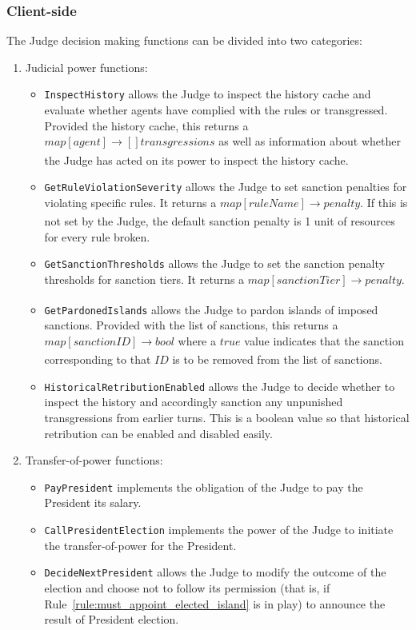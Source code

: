 \subsubsection{Client-side}
The Judge decision making functions can be divided into two categories:
\begin{enumerate}
    \item Judicial power functions:
    \begin{itemize}
        \item \texttt{InspectHistory} allows the Judge to inspect the history cache and evaluate whether agents have complied with the rules or transgressed. Provided the history cache, this returns a $map[agent] \xrightarrow[]{} []transgressions$ as well as information about whether the Judge has acted on its power to inspect the history cache.
        \item \texttt{GetRuleViolationSeverity} allows the Judge to set sanction penalties for violating specific rules. It returns a $map[ruleName] \xrightarrow[]{} penalty$. If this is not set by the Judge, the default sanction penalty is 1 unit of resources for every rule broken.
        \item \texttt{GetSanctionThresholds} allows the Judge to set the sanction penalty thresholds for sanction tiers. It returns a $map[sanctionTier] \xrightarrow[]{} penalty$.
        \item \texttt{GetPardonedIslands} allows the Judge to pardon islands of imposed sanctions. Provided with the list of sanctions, this returns a $map[sanctionID] \xrightarrow[]{} bool$ where a $true$ value indicates that the sanction corresponding to that $ID$ is to be removed from the list of sanctions.
        \item \texttt{HistoricalRetributionEnabled} allows the Judge to decide whether to inspect the history and accordingly sanction any unpunished transgressions from earlier turns. This is a boolean value so that historical retribution can be enabled and disabled easily.
    \end{itemize}
    \item Transfer-of-power functions:
    \begin{itemize}
        \item \texttt{PayPresident} implements the obligation of the Judge to pay the President its salary. 
        \item \texttt{CallPresidentElection} implements the power of the Judge to initiate the transfer-of-power for the President.
        \item \texttt{DecideNextPresident} allows the Judge to modify the outcome of the election and choose not to follow its permission (that is, if Rule~\ref{rule:must_appoint_elected_island} is in play) to announce the result of President election.
    \end{itemize}
\end{enumerate}
